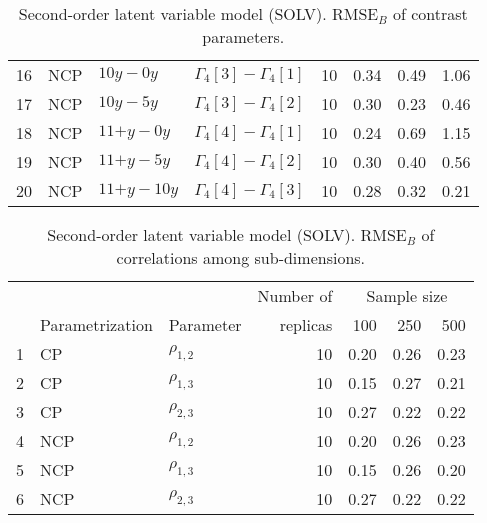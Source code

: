 \begin{table}[H]
\begin{tabular}{rlllrrrr}
		16 & NCP & \footnotesize{$10y - 0y$} & $\Gamma_{4}[3] - \Gamma_{4}[1]$ & 10 & 0.34 & 0.49 & 1.06 \\
		17 & NCP & \footnotesize{$10y - 5y$} & $\Gamma_{4}[3] - \Gamma_{4}[2]$ & 10 & 0.30 & 0.23 & 0.46 \\
		18 & NCP & \footnotesize{$11\text{+}y - 0y$} & $\Gamma_{4}[4] - \Gamma_{4}[1]$ & 10 & 0.24 & 0.69 & 1.15 \\ 
		19 & NCP & \footnotesize{$11\text{+}y - 5y$} & $\Gamma_{4}[4] - \Gamma_{4}[2]$ & 10 & 0.30 & 0.40 & 0.56 \\
		20 & NCP & \footnotesize{$11\text{+}y - 10y$} & $\Gamma_{4}[4] - \Gamma_{4}[3]$ & 10 & 0.28 & 0.32 & 0.21 \\    
		\hline
	\end{tabular}
	\caption[Second-order latent variable model (SOLV). $\text{RMSE}_{B}$ of contrast parameters.]%
	{Second-order latent variable model (SOLV). $\text{RMSE}_{B}$ of contrast parameters.} 
	\label{tab:SOLV_RMSE_contrasts}
\end{table}
%
\begin{table}[H]
	\centering
	\begin{tabular}{rllrrrr}
		\hline
		\multicolumn{3}{c}{ } & Number of &\multicolumn{3}{c}{ Sample size } \\ 
		\cmidrule(rl){5-7}
		& Parametrization  & Parameter & replicas & 100 & 250 & 500 \\  
		\hline\hline
		1 & CP & $\rho_{1,2}$ &  10 & 0.20 & 0.26 & 0.23 \\ 
		2 & CP & $\rho_{1,3}$ &  10 & 0.15 & 0.27 & 0.21 \\ 
		3 & CP & $\rho_{2,3}$ &  10 & 0.27 & 0.22 & 0.22 \\ 
		\hline
		4 & NCP & $\rho_{1,2}$ &  10 & 0.20 & 0.26 & 0.23 \\ 
		5 & NCP & $\rho_{1,3}$ &  10 & 0.15 & 0.26 & 0.20 \\ 
		6 & NCP & $\rho_{2,3}$ &  10 & 0.27 & 0.22 & 0.22 \\
		\hline
	\end{tabular}
	\caption[Second-order latent variable model (SOLV). $\text{RMSE}_{B}$ of correlations among sub-dimensions.]%
	{Second-order latent variable model (SOLV). $\text{RMSE}_{B}$ of correlations among sub-dimensions.}
	\label{tab:SOLV_RMSE_corr}
\end{table}
%
